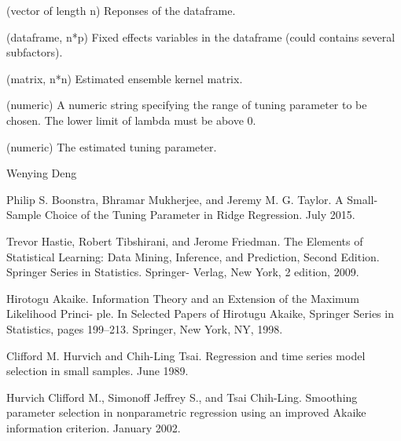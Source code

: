 \documentclass[a4paper]{book}
\begin{document}
\begin{Arguments}
\begin{ldescription}
\item[\code{Y}] (vector of length n) Reponses of the dataframe.

\item[\code{X}] (dataframe, n*p) Fixed effects variables in the dataframe (could
contains several subfactors).

\item[\code{K\_mat}] (matrix, n*n) Estimated ensemble kernel matrix.

\item[\code{lambda}] (numeric) A numeric string specifying the range of tuning parameter 
to be chosen. The lower limit of lambda must be above 0.
\end{ldescription}
\end{Arguments}
%
\begin{Details}\relax
{}

\end{Details}
%
\begin{Value}
\begin{ldescription}
\item[\code{lambda0}] (numeric) The estimated tuning parameter.
\end{ldescription}
\end{Value}
%
\begin{Author}\relax
Wenying Deng
\end{Author}
%
\begin{References}\relax
Philip S. Boonstra, Bhramar Mukherjee, and Jeremy M. G. Taylor.
A Small-Sample Choice of the Tuning Parameter in Ridge Regression. July
2015.

Trevor Hastie, Robert Tibshirani, and Jerome Friedman. The Elements of
Statistical Learning: Data Mining, Inference, and Prediction, Second
Edition. Springer Series in Statistics. Springer- Verlag, New York, 2
edition, 2009.

Hirotogu Akaike. Information Theory and an Extension of the Maximum
Likelihood Princi- ple. In Selected Papers of Hirotugu Akaike, Springer
Series in Statistics, pages 199–213. Springer, New York, NY, 1998.

Clifford M. Hurvich and Chih-Ling Tsai. Regression and time series model
selection in small samples. June 1989.

Hurvich Clifford M., Simonoff Jeffrey S., and Tsai Chih-Ling. Smoothing
parameter selection in nonparametric regression using an improved Akaike
information criterion. January 2002.
\end{References}
\printindex{}
\end{document}
